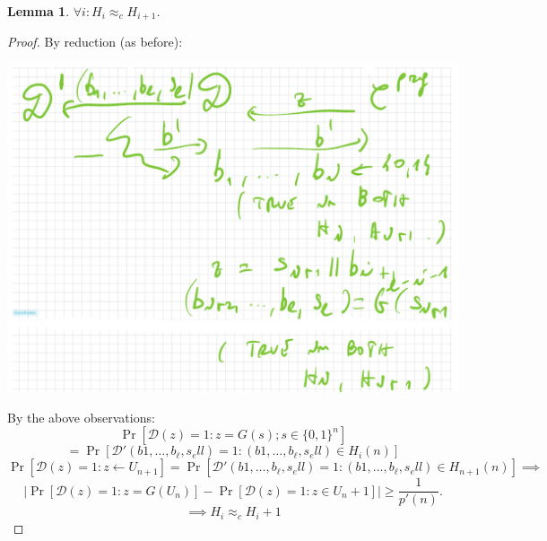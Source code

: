 \documentclass[11pt, a4paper]{article}
\newtheorem{lem}{Lemma}
\begin{document}
\begin{lem}
    $\forall i : H_i \approx_c H_{i+1}$.
\end{lem}
\begin{proof}
    By reduction (as before):
    \begin{center}
        \includegraphics[scale=0.4]{img/Comp_sec/Reduction.png}
    \end{center}
    By the above observations:
    $$\Pr[\mathcal{D}(z) = 1: z = G(s); s \in \{0,1\}^n] $$
    $$= \Pr[\mathcal{D}'(b1,\dots,b_\ell,s_ell) = 1 : (b1,\dots,b_\ell,s_ell) \in H_i (n)]$$
    $$ \Pr[\mathcal{D}(z) = 1 : z \leftarrow U_{n+1}] = \Pr[\mathcal{D}' (b1,\dots,b_\ell,s_ell) = 1 : (b1,\dots,b_\ell,s_ell) \in H_{n+1}(n)] \implies $$
    $$ |\Pr[\mathcal{D}(z)=1 : z = G(U_n)] - \Pr[\mathcal{D}(z) = 1: z \in U_n+1]| \geq \frac{1}{p'(n)}.$$
    $$\implies H_i \approx_c H_i + 1$$
\end{proof}
\end{document}

